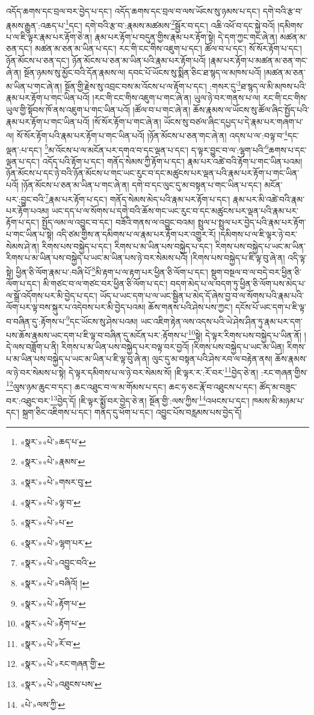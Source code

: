 འདོད་ཆགས་དང་བྲལ་བར་བྱེད་པ་དང་། འདོད་ཆགས་དང་བྲལ་བ་ལས་ཡོངས་སུ་ཉམས་པ་དང་། དགེ་བའི་རྩ་བ་རྣམས་རྒྱུན་:འཆད་པ་\footnote{«སྣར་»«པེ་»ཆད་པ་}དང་། དགེ་བའི་རྩ་བ་:རྣམས་མཚམས་\footnote{«སྣར་»«པེ་»རྣམས་}སྦྱོར་བ་དང་། འཆི་འཕོ་བ་དང་སྐྱེ་བའོ། །དམིགས་པ་ལ་ཇི་ལྟར་རྣམ་པར་རྟོག་ཅེ་ན། རྣམ་པར་རྟོག་པ་བདུན་གྱིས་རྣམ་པར་རྟོག་སྟེ། དེ་དག་ཀྱང་གང་ཞེ་ན། མཚན་མ་ཅན་དང་། མཚན་མ་ཅན་མ་ཡིན་པ་དང་། རང་གི་ངང་གིས་འཇུག་པ་དང་། ཚོལ་བ་པ་དང་། སོ་སོར་རྟོག་པ་དང་། ཉོན་མོངས་པ་ཅན་དང་། ཉོན་མོངས་པ་ཅན་མ་ཡིན་པའི་རྣམ་པར་རྟོག་པའོ། །རྣམ་པར་རྟོག་པ་མཚན་མ་ཅན་གང་ཞེ་ན། སྔོན་ཉམས་སུ་མྱོང་བའི་དོན་རྣམས་ལ། དབང་པོ་ཡོངས་སུ་སྨིན་ཅིང་ཐ་སྙད་ལ་མཁས་པའོ། །མཚན་མ་ཅན་མ་ཡིན་པ་གང་ཞེ་ན། སྔོན་གྱི་རྗེས་སུ་འབྲང་བས་མ་འོངས་པ་ལ་རྟོག་པ་དང་། :གསར་དུ་\footnote{«སྣར་»«པེ་»གསར་བུ་}ཐ་སྙད་ལ་མི་མཁས་པའི་རྣམ་པར་རྟོག་པ་གང་ཡིན་པའོ། །རང་གི་ངང་གིས་འཇུག་པ་གང་ཞེ་ན། ཡུལ་ཉེ་བར་གནས་པ་ལ། རང་གི་ངང་གིས་ཡུལ་གྱི་སྟོབས་ཁོ་ནས་འཇུག་པ་གང་ཡིན་པའོ། །ཚོལ་བ་པ་གང་ཞེ་ན། ཆོས་རྣམས་ལ་ཡོངས་སུ་ཚོལ་ཞིང་སྤྱོད་པའི་རྣམ་པར་རྟོག་པ་གང་ཡིན་པའོ། །སོ་སོར་རྟོག་པ་གང་ཞེ་ན། ཡོངས་སུ་བཙལ་ཞིང་དཔྱད་པ་དེ་རྣམ་པར་གཞག་པ་ལ། སོ་སོར་རྟོག་པའི་རྣམ་པར་རྟོག་པ་གང་ཡིན་པའོ། །ཉོན་མོངས་པ་ཅན་གང་ཞེ་ན། འདས་པ་ལ་:བལྟ་བ་\footnote{«སྣར་»«པེ་»ལྟ་བ་}དང་ལྡན་:པ་དང་། \footnote{«སྣར་»«པེ་»པ་}མ་འོངས་པ་ལ་མངོན་པར་དགའ་བ་དང་ལྡན་པ་དང་། ད་ལྟར་བྱུང་བ་ལ་:ལྷག་པའི་\footnote{«སྣར་»«པེ་»ལྷག་པར་}ཆགས་པ་དང་ལྡན་པ་དང་། འདོད་པའི་རྟོག་པ་དང་། གནོད་སེམས་ཀྱི་རྟོག་པ་དང་། རྣམ་པར་འཚེ་བའི་རྟོག་པ་གང་ཡིན་པའམ། ཉོན་མོངས་པ་དང་ཉེ་བའི་ཉོན་མོངས་པ་གང་ཡང་རུང་བ་དང་མཚུངས་པར་ལྡན་པའི་རྣམ་པར་རྟོག་པ་གང་ཡིན་པའོ། །ཉོན་མོངས་པ་ཅན་མ་ཡིན་པ་གང་ཞེ་ན། དགེ་བ་དང་ལུང་དུ་མ་བསྟན་པ་གང་ཡིན་པ་དང་། མངོན་པར་:བྱུང་བའི་\footnote{«སྣར་»«པེ་»འབྱུང་བའི་}རྣམ་པར་རྟོག་པ་དང་། གནོད་སེམས་མེད་པའི་རྣམ་པར་རྟོག་པ་དང་། རྣམ་པར་མི་འཚེ་བའི་རྣམ་པར་རྟོག་པའམ། ཡང་དད་པ་ལ་སོགས་པ་དགེ་བའི་ཆོས་གང་ཡང་རུང་བ་དང་མཚུངས་པར་ལྡན་པའི་རྣམ་པར་རྟོག་པ་དང་། སྤྱོད་ལམ་ལ་འབྱུང་བ་དང་། བཟོའི་གནས་ལ་འབྱུང་བའམ། སྤྲུལ་པ་སྤྲུལ་པར་བྱེད་པའི་རྣམ་པར་རྟོག་པ་གང་ཡིན་པ་སྟེ། འདི་ཙམ་གྱིས་ན་དམིགས་པ་ལ་རྣམ་པར་རྟོག་པར་འགྱུར་རོ། །དམིགས་པ་ལ་ཇི་ལྟར་ཉེ་བར་སེམས་ཤེ་ན། རིགས་པས་བསྐྱེད་པ་དང་། རིགས་པ་མ་ཡིན་པས་བསྐྱེད་པ་དང་། རིགས་པས་བསྐྱེད་པ་ཡང་མ་ཡིན་རིགས་པ་མ་ཡིན་པས་བསྐྱེད་པ་ཡང་མ་ཡིན་པས་ཉེ་བར་སེམས་པའོ། །རིགས་པས་བསྐྱེད་པ་ཇི་ལྟ་བུ་ཞེ་ན། འདི་ལྟ་སྟེ། ཕྱིན་ཅི་ལོག་རྣམ་པ་:བཞི་པོ་\footnote{«སྣར་»«པེ་»བཞིའོ། །}མི་རྟག་པ་ལ་རྟག་པར་ཕྱིན་ཅི་ལོག་པ་དང་། སྡུག་བསྔལ་བ་ལ་བདེ་བར་ཕྱིན་ཅི་ལོག་པ་དང་། མི་གཙང་བ་ལ་གཙང་བར་ཕྱིན་ཅི་ལོག་པ་དང་། བདག་མེད་པ་ལ་བདག་ཏུ་ཕྱིན་ཅི་ལོག་པས་མེད་པ་ལ་སྒྲོ་འདོགས་པར་མི་བྱེད་པ་དང་། ཡོད་པ་ཡང་དག་པ་ལ་ཡང་སྦྱིན་པ་མེད་དོ་ཞེས་བྱ་བ་ལ་སོགས་པའི་རྣམ་པའི་ལོག་པར་ལྟ་བས་སྐུར་པ་འདེབས་པར་མི་བྱེད་པའམ། ཆོས་གནས་པའི་ཤེས་པས་ཀྱང་། དངོས་པོ་ཡང་དག་པ་ཇི་ལྟ་བ་བཞིན་དུ་:རྟོགས་པ་\footnote{«སྣར་»«པེ་»རྟོག་པ་}དང་ཡོངས་སུ་ཤེས་པའམ། ཡང་འཇིག་རྟེན་ལས་འདས་པའི་ཡེ་ཤེས་ཤིན་ཏུ་རྣམ་པར་དག་པས་ཆོས་རྣམས་ཡང་དག་པ་ཇི་ལྟ་བ་བཞིན་དུ་མངོན་པར་:རྟོགས་པ་\footnote{«སྣར་»«པེ་»རྟོག་པ་}སྟེ། དེ་ལྟར་རིགས་པས་བསྐྱེད་པ་ཡིན་ནོ། །དེ་ལས་བཟློག་པ་ནི། རིགས་པ་མ་ཡིན་པས་བསྐྱེད་པར་བལྟ་བར་བྱའོ། །རིགས་པས་བསྐྱེད་པ་ཡང་མ་ཡིན། རིགས་པ་མ་ཡིན་པས་བསྐྱེད་པ་ཡང་མ་ཡིན་པ་ཇི་ལྟ་བུ་ཞེ་ན། ལུང་དུ་མ་བསྟན་པའི་ཤེས་རབ་ལ་བརྟེན་ནས། ཆོས་རྣམས་ལ་ཉེ་བར་སེམས་པ་སྟེ། དེ་ལྟར་དམིགས་པ་ལ་ཉེ་བར་སེམས་སོ། །ཇི་ལྟར་ར་:རོ་བར་\footnote{«སྣར་»«པེ་»རོ་བ་}བྱེད་ཅེ་ན། :རང་གཞན་གྱིས་\footnote{«སྣར་»«པེ་»རང་གཞན་གྱི་}ལུས་ཉམ་ཆུང་བ་དང་། ཆང་འཐུང་བ་ལ་མ་གོམས་པ་དང་། ཆང་ཧ་ཅང་རྣོ་བ་འཐུངས་པ་དང་། ཚོད་མ་བཟུང་བར་:འཐུང་བར་\footnote{«སྣར་»«པེ་»འཐུངས་པས་}བྱེད་དོ། །ཇི་ལྟར་སྨྱོ་བར་བྱེད་ཅེ་ན། སྔོན་གྱི་:ལས་ཀྱིས་\footnote{«པེ་»ལས་ཀྱི་}འཕངས་པ་དང་། ཁམས་མི་མཉམ་པ་དང་། སྐྲག་ཅིང་འཇིགས་པ་དང་། གནད་དུ་ཕོག་པ་དང་། འབྱུང་པོས་བརླམས་པས་བྱེད་དོ། 